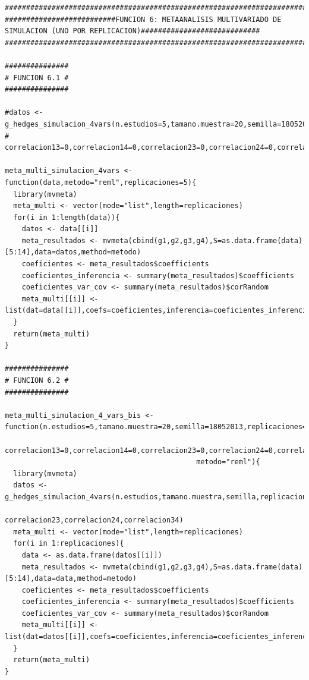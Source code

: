 \documentclass[a4paper,openright,12pt]{report}
\begin{document}
{\begin{verbatim}
##############################################################################################################################
##########################FUNCION 6: METAANALISIS MULTIVARIADO DE SIMULACION (UNO POR REPLICACION)############################
##############################################################################################################################

###############
# FUNCION 6.1 #
###############

#datos <- g_hedges_simulacion_4vars(n.estudios=5,tamano.muestra=20,semilla=18052013,replicaciones=5,correlacion12=0,
#                                   correlacion13=0,correlacion14=0,correlacion23=0,correlacion24=0,correlacion34=0)

meta_multi_simulacion_4vars <- function(data,metodo="reml",replicaciones=5){
  library(mvmeta)
  meta_multi <- vector(mode="list",length=replicaciones)
  for(i in 1:length(data)){
    datos <- data[[i]]
    meta_resultados <- mvmeta(cbind(g1,g2,g3,g4),S=as.data.frame(data)[5:14],data=datos,method=metodo)
    coeficientes <- meta_resultados$coefficients
    coeficientes_inferencia <- summary(meta_resultados)$coefficients
    coeficientes_var_cov <- summary(meta_resultados)$corRandom
    meta_multi[[i]] <- list(dat=data[[i]],coefs=coeficientes,inferencia=coeficientes_inferencia,var_cov=coeficientes_var_cov)
  }
  return(meta_multi)  
}

###############
# FUNCION 6.2 #
###############

meta_multi_simulacion_4_vars_bis <- function(n.estudios=5,tamano.muestra=20,semilla=18052013,replicaciones=5,correlacion12=0,
                                             correlacion13=0,correlacion14=0,correlacion23=0,correlacion24=0,correlacion34=0,
                                             metodo="reml"){
  library(mvmeta)
  datos <- g_hedges_simulacion_4vars(n.estudios,tamano.muestra,semilla,replicaciones,correlacion12,correlacion13,correlacion14,
                                     correlacion23,correlacion24,correlacion34)
  meta_multi <- vector(mode="list",length=replicaciones)
  for(i in 1:replicaciones){
    data <- as.data.frame(datos[[i]])
    meta_resultados <- mvmeta(cbind(g1,g2,g3,g4),S=as.data.frame(data)[5:14],data=data,method=metodo)
    coeficientes <- meta_resultados$coefficients
    coeficientes_inferencia <- summary(meta_resultados)$coefficients
    coeficientes_var_cov <- summary(meta_resultados)$corRandom
    meta_multi[[i]] <- list(dat=datos[[i]],coefs=coeficientes,inferencia=coeficientes_inferencia,var_cov=coeficientes_var_cov)
  }
  return(meta_multi)  
}
\end{verbatim}}
\end{document}
